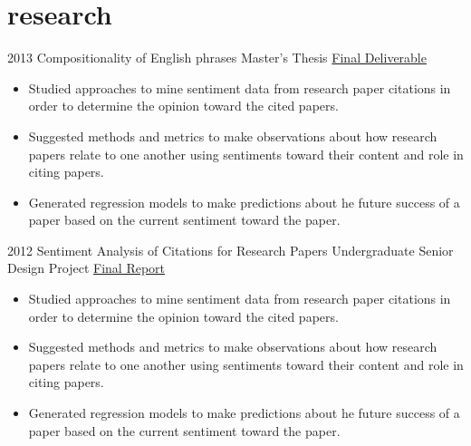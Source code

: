 \documentclass[]{patyoon-cv}
\begin{document}
\section{research}
\begin{entrylist}
  \entry
    {2013}
    {Compositionality of English phrases}
    {Master's Thesis   \href{http://www.patyoon.com/master\_thesis\_final.pdf}{Final Deliverable}}
    {
      \begin{itemize}
      \item Studied approaches to mine sentiment data from research paper citations in order to determine the opinion toward the cited papers.
      \item Suggested methods and metrics to make observations about how research papers relate to one another using sentiments toward their content and role in citing papers.
      \item Generated regression models to make predictions about he future success of a paper based on the current sentiment toward the paper.
      \end{itemize}
    }
  \entry
    {2012}
    {Sentiment Analysis of Citations for Research Papers}
    {Undergraduate Senior Design Project  \href{http://www.patyoon.com/senior\_design\_final\_report.pdf}{Final Report}}
    {
      \begin{itemize}
      \item Studied approaches to mine sentiment data from research paper citations in order to determine the opinion toward the cited papers.
      \item Suggested methods and metrics to make observations about how research papers relate to one another using sentiments toward their content and role in citing papers.
      \item Generated regression models to make predictions about he future success of a paper based on the current sentiment toward the paper.
      \end{itemize}
    }    
\end{entrylist}
      

\end{document}
